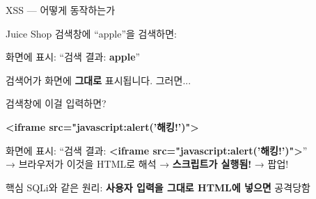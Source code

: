 \documentclass[aspectratio=169,10pt]{beamer}
\newcommand{\hlt}[1]{\textcolor{accent}{\textbf{#1}}}
\newcommand{\red}[1]{\textcolor{redTeam}{\textbf{#1}}}
\begin{document}
\begin{frame}[shrink=5]{XSS — 어떻게 동작하는가}

Juice Shop 검색창에 ``apple''을 검색하면:

\vspace{0.3em}
\begin{center}
\colorbox{layer2}{\parbox{0.7\textwidth}{\ttfamily\small
화면에 표시: ``검색 결과: \textbf{apple}''
}}
\end{center}

\vspace{0.3em}
검색어가 화면에 \hlt{그대로} 표시됩니다. 그러면...

\vspace{0.3em}
검색창에 이걸 입력하면?

\vspace{0.3em}
\begin{center}
\colorbox{layer3}{\parbox{0.7\textwidth}{\ttfamily\small
\red{<iframe src="javascript:alert('해킹!')">}
}}
\end{center}

\vspace{0.3em}
\begin{center}
\colorbox{accent!10}{\parbox{0.7\textwidth}{\ttfamily\small
화면에 표시: ``검색 결과: \red{<iframe src="javascript:alert('해킹!')">}''\\[0.2em]
→ 브라우저가 이것을 HTML로 해석 → \hlt{스크립트가 실행됨!} → 팝업!
}}
\end{center}

\vspace{0.3em}
\begin{alertblock}{핵심}
SQLi와 같은 원리: \hlt{사용자 입력을 그대로 HTML에 넣으면} 공격당함
\end{alertblock}
\end{frame}
\end{document}
